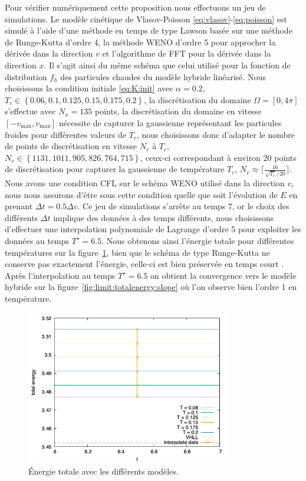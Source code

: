 Pour vérifier numériquement cette proposition nous effectuons un jeu de simulations. Le modèle cinétique de Vlasov-Poisson \eqref{eq:vlasov}-\eqref{eq:poisson} est simulé à l'aide d'une méthode en temps de type Lawson basée sur une méthode de Runge-Kutta d'ordre 4, la méthode WENO d'ordre 5 pour approcher la dérivée dans la direction $v$ et l'algorithme de FFT pour la dérivée dans la direction $x$. Il s'agit ainsi du même schéma que celui utilisé pour la fonction de distribution $f_h$ des particules chaudes du modèle hybride linéarisé. Nous choisissons la condition initiale \eqref{eq:K:init} avec $\alpha = 0.2$, $T_c \in \left\{ 0.06,0.1,0.125,0.15,0.175,0.2\right\}$, la discrétisation du domaine $\Omega = [0,4\pi]$ s'effectue avec $N_x = 135$ points, la discrétisation du domaine en vitesse $[-v_{\text{max}},v_{\text{max}}]$ nécessite de capturer la gaussienne représentant les particules froides pour différentes valeurs de $T_c$, nous choisissons donc d'adapter le nombre de points de discrétisation en vitesse $N_v$ à $T_c$, $N_v \in \left\{ 1131,1011,905,826,764,715 \right\}$, ceux-ci correspondant à environ 20 points de discrétisation pour capturer la gaussienne de temp\'erature $T_c$, $N_v \approx \lceil \frac{16}{{\sqrt{T_c}}/{20}} \rceil$. Nous avons une condition CFL sur le schéma WENO utilisé dans la direction $v$, nous nous assurons d'être sous cette condition quelle que soit l'évolution de $E$ en prenant $\Delta t = 0.5\Delta v$. Ce jeu de simulations s'arrête au temps 7, or le choix des différents $\Delta t$ implique des données à des temps différents, nous choisissons d'effectuer une interpolation polynomiale de Lagrange d'ordre 5 pour exploiter les données au temps $T^\star = 6.5$. Nous obtenons ainsi l'énergie totale pour différentes températures sur la figure~\ref{fig:limit:totalenergy}, bien que le schéma de type Runge-Kutta ne conserve pas exactement l'énergie, celle-ci est bien préservée en temps court . Apr\`es l'interpolation au temps $T^\star = 6.5$ on obtient la convergence vers le modèle hybride sur la figure~\ref{fig:limit:totalenergy:slope} où l'on observe bien l'ordre 1 en température.
\begin{figure}[h]
  \centering
  \includegraphics[width=0.8\textwidth]{img/limit_totalenergy.png}
  \caption{Énergie totale avec les différents modèles.}
  \label{fig:limit:totalenergy}
\end{figure}
